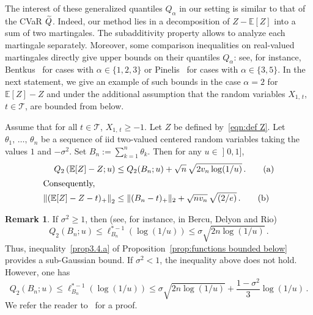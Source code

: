 \documentclass[10pt]{amsart}
\theoremstyle{definition}\newtheorem{defi}[theo]{Definition}\newtheorem{rema}[theo]{Remark}\newtheorem{exam}[theo]{Example}\newtheorem{exem}[theo]{Example}\newtheorem{nota}[theo]{Notation}
\newcommand{\bE}{\mathbb{E}}
\newcommand{\cT}{\mathcal{T}}
\newcommand{\intervalleof}[2]{\mathopen{]} #1\mathclose{}\mathpunct{},#2\mathclose{]}}
\let\oldtilde\tilde
\renewcommand*{\tilde}[1]{\mathchoice{\widetilde{#1}}{\widetilde{#1}}{\oldtilde{#1}}{\oldtilde{#1}}}
\begin{document}
The interest of these generalized quantiles $Q_\alpha$ in our setting is similar to that of the CVaR $\tilde Q$. Indeed, our method lies in a decomposition of $Z-\bE[Z]$ into a sum of two martingales. The subadditivity property allows to analyze each martingale separately. Moreover, some comparison inequalities on real-valued martingales directly give upper bounds on their quantiles $Q_\alpha$: see, for instance, Bentkus~\cite{Bentkus04} for cases with $\alpha\in\{1,2,3\}$ or Pinelis~\cite{Pinelis06,Pinelis14a} for cases with $\alpha\in\{3,5\}$. In the next statement, we give an example of such bounds in the case $\alpha=2$ for $\bE[Z]-Z$ and under the additional assumption that the random variables $X_{1,\,t}$, $t\in\cT$, are bounded from below.

\begin{prop}\label{prop:functions bounded below}
Assume that for all $t\in\cT$, $X_{1,\,t}\geq -1$. Let $Z$ be defined by~\eqref{eqn:def Z}. Let $\theta_1,\,\ldots,\,\theta_n$ be a sequence of iid two-valued centered random variables taking the values $1$ and $-\sigma^2$. Set $B_n:=\sum_{k=1}^n \theta_k$. Then for any $u\in\intervalleof 01$,
\begin{align}
Q_2\left(\bE[Z]-Z;u\right)&\leq Q_2(B_n;u)+\sqrt{n}\,\sqrt{2v_n\log(1/u)}\,.\tag{$\rm a$}\label{prop3.4.a}\\
\intertext{Consequently,}
\left\|(\bE[Z]-Z-t)_+\right\|_2&\leq \|(B_n-t)_+\|_2+\sqrt {nv_n}\,\sqrt{(2/e)}\,.\tag{$\rm b$}\label{prop3.4.b}
\end{align}
\end{prop}

\begin{rema}
If $\sigma^2\geq 1$, then (see, for instance, \cite[Lemma~2.36]{BDR15} in Bercu, Delyon and Rio)
\begin{equation}
Q_2(B_n;u)\leq \ell_{B_n}^{*-1}(\log(1/u))\leq \sigma \sqrt{2n\log(1/u)}\,.
\end{equation}
Thus, inequality~\eqref{prop3.4.a} of Proposition~\ref{prop:functions bounded below} provides a sub-Gaussian bound. If $\sigma^2<1$, the inequality above does not hold. However, one has
\begin{equation}
Q_2(B_n;u)\leq \ell_{B_n}^{*-1}(\log(1/u))\leq \sigma \sqrt{2n\log(1/u)}+\frac{1-\sigma^2}{3}\log(1/u)\,.
\end{equation}
We refer the reader to~\cite[Theorem~2.28 and Exercise~6 in Section~2.9]{BDR15} for a proof.
\end{rema}
\end{document}
